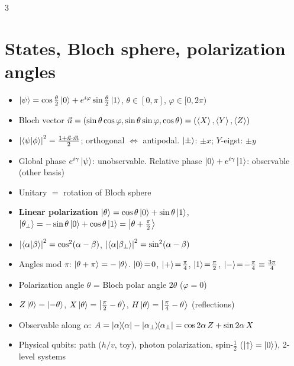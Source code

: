 \documentclass[10pt]{article}
\newcommand{\trap}{\textcolor{red!70!black}}   %
\newcommand{\pp}{\ket{+}}
\newcommand{\mm}{\ket{-}}
\begin{document}
\begin{multicols*}{3}
\section{States, Bloch sphere, polarization angles}
\begin{itemize}
  \item $\ket\psi=\cos\tfrac\theta2\ket0+e^{i\varphi}\sin\tfrac\theta2\ket1$, $\theta\!\in\![0,\pi]$, $\varphi\!\in\![0,2\pi)$
  \item Bloch vector $\vec n=(\sin\theta\cos\varphi,\sin\theta\sin\varphi,\cos\theta)=(\ev{X},\ev{Y},\ev{Z})$
  \item $\abs{\braket{\psi}{\phi}}^2=\tfrac{1+\vec n\cdot\vec m}{2}$; orthogonal $\Leftrightarrow$ antipodal. $\ket{\pm}$: $\pm x$; $Y$-eigst: $\pm y$
  \item Global phase $e^{i\gamma}\ket\psi$: unobservable. Relative phase $\ket0+e^{i\gamma}\ket1$: observable (other basis)
  \item Unitary $=$ rotation of Bloch sphere
  \item \textbf{Linear polarization} $\ket\theta=\cos\theta\ket0+\sin\theta\ket1$, $\ket{\theta_\perp}=-\sin\theta\ket0+\cos\theta\ket1=\ket{\theta+\tfrac\pi2}$
  \item $\abs{\braket{\alpha}{\beta}}^2=\cos^2(\alpha-\beta)$, $\abs{\braket{\alpha}{\beta_\perp}}^2=\sin^2(\alpha-\beta)$
  \item \trap{Angles mod $\pi$}: $\ket{\theta+\pi}=-\ket\theta$. $\ket0\!=\!0$, $\pp\!=\!\tfrac\pi4$, $\ket1\!=\!\tfrac\pi2$, $\mm\!=\!-\tfrac\pi4\equiv\tfrac{3\pi}4$
  \item \trap{Polarization angle $\theta$ = Bloch polar angle $2\theta$} ($\varphi=0$)
  \item $Z\ket\theta=\ket{-\theta}$, $X\ket\theta=\ket{\tfrac\pi2-\theta}$, $H\ket\theta=\ket{\tfrac\pi4-\theta}$ (reflections)
  \item Observable along $\alpha$: $A=\dyad{\alpha}-\dyad{\alpha_\perp}=\cos2\alpha\,Z+\sin2\alpha\,X$
  \item Physical qubits: path ($h/v$, toy), photon polarization, spin-$\tfrac12$ ($\ket\uparrow=\ket0$), 2-level systems
\end{itemize}


\end{multicols*}
\end{document}

